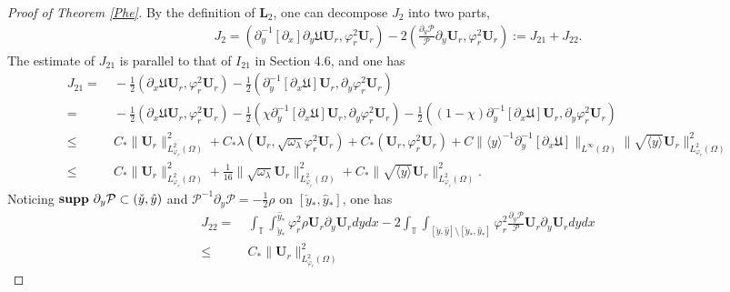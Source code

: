 \documentclass[10pt,a4paper]{amsart}
\newcommand\y{{{\langle y \rangle}}}
\begin{document}
\begin{proof}[Proof of Theorem \ref{Phe}]
By the definition of $\mathbf{L}_{2}$, one can decompose $J_{2}$ into two parts,
\begin{align*}
J_{2}
= (\partial_{y}^{-1}[\partial_{x}]\partial_{y}\mathfrak{U}\mathbf{U}_{r},\varphi_{r}^{2}\mathbf{U}_{r})
 -2\left(\frac{\partial_{y}\mathcal{P}}{\mathcal{P}} \partial_{y}\mathbf{U}_{r},\varphi_{r}^{2}\mathbf{U}_{r}\right)
:=J_{21}+J_{22}.
\end{align*}
The estimate of $J_{21}$ is parallel to that of $I_{21}$ in Section 4.6, and one has
\begin{align*}
J_{21}
=&~-\frac{1}{2}(\partial_{x}\mathfrak{U}\mathbf{U}_{r},\varphi_{r}^{2}\mathbf{U}_{r})
  -\frac{1}{2}(\partial_{y}^{-1}\left[\partial_{x}\mathfrak{U}\right]\mathbf{U}_{r},\partial_{y}\varphi_{r}^{2}\mathbf{U}_{r})\\
=&~-\frac{1}{2}(\partial_{x}\mathfrak{U}\mathbf{U}_{r},\varphi_{r}^{2}\mathbf{U}_{r})
  -\frac{1}{2}(\chi\partial_{y}^{-1}\left[\partial_{x}\mathfrak{U}\right]\mathbf{U}_{r},\partial_{y}\varphi_{r}^{2}\mathbf{U}_{r})
  -\frac{1}{2}((1-\chi)\partial_{y}^{-1}\left[\partial_{x}\mathfrak{U}\right]\mathbf{U}_{r},\partial_{y}\varphi_{r}^{2}\mathbf{U}_{r})\\
\leq&~C_{*}\|\mathbf{U}_{r}\|_{L_{\varphi_{r}}^{2}(\Omega)}^{2}
     +C_{*}\lambda(\mathbf{U}_{r},\sqrt{\omega_{\lambda}}\varphi_{r}^{2}\mathbf{U}_{r})
     +C_{*}(\mathbf{U}_{r},\varphi_{r}^{2}\mathbf{U}_{r})
     +C\|\y^{-1}\partial_{y}^{-1}\left[\partial_{x}\mathfrak{U}\right]\|_{L^{\infty}(\Omega)}
       \|\sqrt{\y}\mathbf{U}_{r}\|_{L_{\varphi_{r}}^{2}(\Omega)}^{2}\\
\leq&~C_{*}\|\mathbf{U}_{r}\|_{L_{\varphi_{r}}^{2}(\Omega)}^{2}
     +\frac{1}{16}\|\sqrt{\omega_{\lambda}}\mathbf{U}_{r}\|_{L_{\varphi_{r}}^{2}(\Omega)}^{2}
     +C_{*}\|\sqrt{\y}\mathbf{U}_{r}\|_{L_{\varphi_{r}}^{2}(\Omega)}^{2}.
\end{align*}
Noticing ${\bf supp}~\partial_{y}\mathcal{P}\subset(\check{y},\hat{y})$ and $\mathcal{P}^{-1}\partial_{y}\mathcal{P}=-\frac{1}{2}\rho$ on $[\check{y}_{*},\hat{y}_{*}]$, one has
\begin{align*}
J_{22}
=&~\int_{\mathbb{T}}\int_{\check{y}_{*}}^{\hat{y}_{*}}\varphi_{r}^{2}\rho\mathbf{U}_{r}\partial_{y}\mathbf{U}_{r}dydx
  -2\int_{\mathbb{T}}\int_{[\check{y},\hat{y}]\setminus[\check{y}_{*},\hat{y}_{*}]}\varphi_{r}^{2}\frac{\partial_{y}\mathcal{P}}{\mathcal{P}}\mathbf{U}_{r}\partial_{y}\mathbf{U}_{r}dydx\\
\leq&~C_{*}\|\mathbf{U}_{r}\|_{L_{\varphi_{r}}^{2}(\Omega)}^{2}

\end{align*}
\end{proof}
\end{document}
